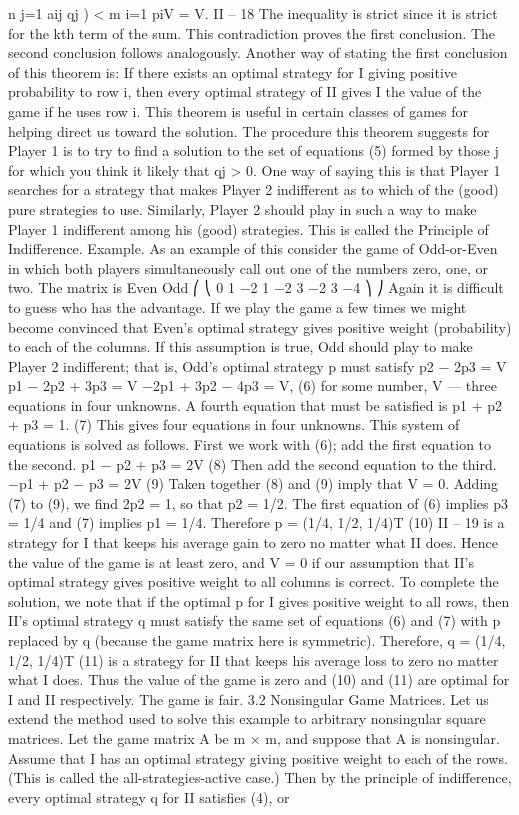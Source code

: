 n
j=1
aij qj ) < 
m
i=1
piV = V.
II – 18
The inequality is strict since it is strict for the kth term of the sum. This contradiction
proves the first conclusion. The second conclusion follows analogously.
Another way of stating the first conclusion of this theorem is: If there exists an optimal
strategy for I giving positive probability to row i, then every optimal strategy of II gives
I the value of the game if he uses row i.
This theorem is useful in certain classes of games for helping direct us toward the
solution. The procedure this theorem suggests for Player 1 is to try to find a solution to
the set of equations (5) formed by those j for which you think it likely that qj > 0. One
way of saying this is that Player 1 searches for a strategy that makes Player 2 indifferent
as to which of the (good) pure strategies to use. Similarly, Player 2 should play in such a
way to make Player 1 indifferent among his (good) strategies. This is called the Principle
of Indifference.
Example. As an example of this consider the game of Odd-or-Even in which both
players simultaneously call out one of the numbers zero, one, or two. The matrix is
Even
Odd
⎛
⎝
0 1 −2
1 −2 3
−2 3 −4
⎞
⎠
Again it is difficult to guess who has the advantage. If we play the game a few times we
might become convinced that Even’s optimal strategy gives positive weight (probability)
to each of the columns. If this assumption is true, Odd should play to make Player 2
indifferent; that is, Odd’s optimal strategy p must satisfy
p2 − 2p3 = V
p1 − 2p2 + 3p3 = V
−2p1 + 3p2 − 4p3 = V,
(6)
for some number, V — three equations in four unknowns. A fourth equation that must be
satisfied is
p1 + p2 + p3 = 1. (7)
This gives four equations in four unknowns. This system of equations is solved as follows.
First we work with (6); add the first equation to the second.
p1 − p2 + p3 = 2V (8)
Then add the second equation to the third.
−p1 + p2 − p3 = 2V (9)
Taken together (8) and (9) imply that V = 0. Adding (7) to (9), we find 2p2 = 1, so that
p2 = 1/2. The first equation of (6) implies p3 = 1/4 and (7) implies p1 = 1/4. Therefore
p = (1/4, 1/2, 1/4)T (10)
II – 19
is a strategy for I that keeps his average gain to zero no matter what II does. Hence the
value of the game is at least zero, and V = 0 if our assumption that II’s optimal strategy
gives positive weight to all columns is correct. To complete the solution, we note that if the
optimal p for I gives positive weight to all rows, then II’s optimal strategy q must satisfy
the same set of equations (6) and (7) with p replaced by q (because the game matrix here
is symmetric). Therefore,
q = (1/4, 1/2, 1/4)T (11)
is a strategy for II that keeps his average loss to zero no matter what I does. Thus the
value of the game is zero and (10) and (11) are optimal for I and II respectively. The game
is fair.
3.2 Nonsingular Game Matrices. Let us extend the method used to solve this
example to arbitrary nonsingular square matrices. Let the game matrix A be m × m,
and suppose that A is nonsingular. Assume that I has an optimal strategy giving positive
weight to each of the rows. (This is called the all-strategies-active case.) Then by the
principle of indifference, every optimal strategy q for II satisfies (4), or

